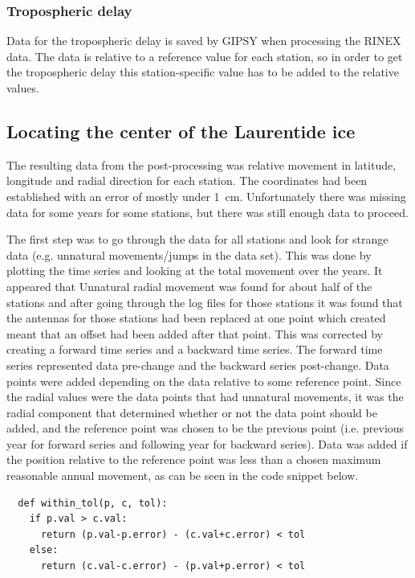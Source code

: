 \documentclass[12pt,a4paper]{article}
\begin{document}
\subsubsection{Tropospheric delay}\label{sec:pp_trop}
Data for the tropospheric delay is saved by GIPSY when processing the RINEX data.
The data is relative to a reference value for each station, so in order to get the tropospheric delay this station-specific value has to be added to the relative values.

\subsection{Locating the center of the Laurentide ice}\label{sec:laurentide}
The resulting data from the post-processing was relative movement in latitude, longitude and radial direction for each station.
The coordinates had been established with an error of mostly under \SI{1}{\centi\meter}.
Unfortunately there was missing data for some years for some stations, but there was still enough data to proceed.

The first step was to go through the data for all stations and look for strange data (e.g. unnatural movements/jumps in the data set).
This was done by plotting the time series and looking at the total movement over the years.
It appeared that 
Unnatural radial movement was found for about half of the stations and after going through the log files for those stations it was found that the antennas for those stations had been replaced at one point which created meant that an offset had been added after that point.
This was corrected by creating a forward time series and a backward time series.
The forward time series represented data pre-change and the backward series post-change.
Data points were added depending on the data relative to some reference point.
Since the radial values were the data points that had unnatural movements, it was the radial component that determined whether or not the data point should be added, and the reference point was chosen to be the previous point (i.e. previous year for forward series and following year for backward series).
Data was added if the position relative to the reference point was less than a chosen maximum reasonable annual movement, as can be seen in the code snippet below.
\begin{lstlisting}
  def within_tol(p, c, tol):
    if p.val > c.val:
      return (p.val-p.error) - (c.val+c.error) < tol
    else:
      return (c.val-c.error) - (p.val+p.error) < tol
\end{lstlisting}
\end{document}
